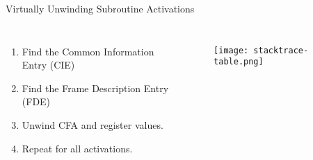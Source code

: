 \begin{frame}{Virtually Unwinding Subroutine Activations}
    \begin{columns}[c] %

        \begin{enumerate}
        	\item Find the Common Information Entry (CIE)
		\item Find the Frame Description Entry (FDE)
		\item Unwind CFA and register values.
		\item Repeat for all activations.
        \end{enumerate}

	\begin{figure}
		\texttt{[image: stacktrace-table.png]}
	\end{figure}
    \end{columns}

\end{frame}


